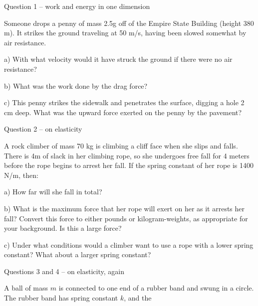 \documentclass[12pt]{article}
\begin{document}
\Large
\centerline{}
\normalsize
\centerline{}
\small

\medskip

\centerline{\large Question 1 -- work and energy in one dimension}

\medskip

Someone drops a penny of mass 2.5g off of the Empire State Building (height 380 m). It strikes the ground traveling at 50 m/s, having been slowed somewhat by air resistance.


\vspace{1in}

a) With what velocity would it have struck the ground if there were no air resistance? 

\vspace{2in}

b) What was the work done by the drag force?

\vspace{2in}

c) This penny strikes the sidewalk and penetrates the surface, digging a hole 2 cm deep. What was the upward force
exerted on the penny by the pavement? 

\newpage

\centerline{\large Question 2 -- on elasticity}

\medskip

A rock climber of mass 70 kg is climbing a cliff face when she slips and falls. 
There is 4m of slack in her climbing rope, so she undergoes free fall for 4 meters before the 
rope begins to arrest her fall. If the spring constant of her rope is 1400 N/m, then:

\vspace{1in}

a) How far will she fall in total?

\vspace{2in}

b) What is the maximum force that her rope will exert on her as it arrests her fall? Convert this force to either pounds or
kilogram-weights, as appropriate for your background. Is this a large force?

\vspace{2in}

c) Under what conditions would a climber want to use a rope with a lower spring constant? What about a larger spring constant?

\newpage

\centerline{\large Questions 3 and 4 -- on elasticity, again}

A ball of mass $m$ is connected to one end of a rubber band and swung in a circle. The rubber band has spring constant $k$, and
the 
\end{document}
